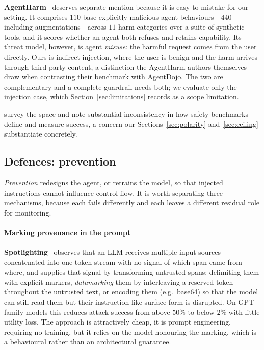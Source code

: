 \documentclass[pdflatex,sn-basic]{sn-jnl}%
\theoremstyle{thmstyleone}
\theoremstyle{thmstyletwo}
\theoremstyle{thmstylethree}
\begin{document}
\textbf{AgentHarm}~\citep{andriushchenko2025agentharm} deserves separate mention
because it is easy to mistake for our setting. It comprises $110$ base explicitly
malicious agent behaviours---$440$ including augmentations---across $11$ harm categories over
a suite of synthetic tools, and it scores whether an agent both refuses and
retains capability. Its threat model, however, is agent \emph{misuse}: the harmful request
comes from the user directly. Ours is indirect injection, where the user is benign
and the harm arrives through third-party content, a distinction the AgentHarm
authors themselves draw when contrasting their benchmark with AgentDojo. The two
are complementary and a complete guardrail needs both; we evaluate only the
injection case, which Section~\ref{sec:limitations} records as a scope
limitation.

\citet{li2026taxonomy} survey the space and note substantial inconsistency in
how safety benchmarks define and measure success, a concern our
Sections~\ref{sec:polarity} and~\ref{sec:ceiling} substantiate concretely.

\subsection{Defences: prevention}

\emph{Prevention} redesigns the agent, or retrains the model, so that injected
instructions cannot influence control flow. It is worth separating three
mechanisms, because each fails differently and each leaves a different residual
role for monitoring.

\paragraph{Marking provenance in the prompt}
\textbf{Spotlighting}~\citep{hines2024spotlighting} observes that an LLM receives
multiple input sources concatenated into one token stream with no signal of which
span came from where, and supplies that signal by transforming untrusted spans:
delimiting them with explicit markers, \emph{datamarking} them by interleaving a
reserved token throughout the untrusted text, or encoding them (e.g.\ base64) so
that the model can still read them but their instruction-like surface form is
disrupted. On GPT-family models this reduces attack success from above $50\%$ to
below $2\%$ with little utility loss. The approach is attractively cheap, it is
prompt engineering, requiring no training, but it relies on the model honouring
the marking, which is a behavioural rather than an architectural guarantee.
\end{document}
